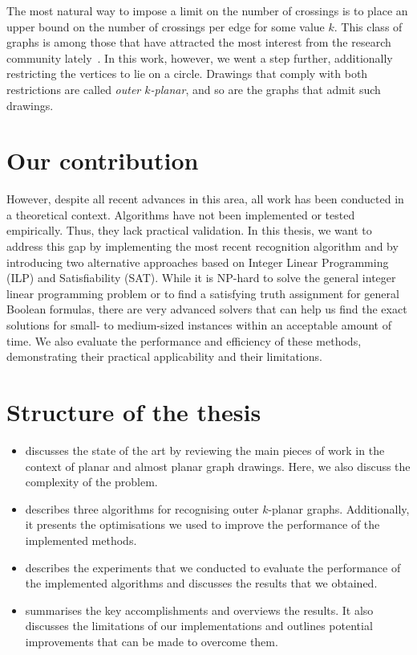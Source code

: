 The most natural way to impose a limit on the number of crossings is to place an upper bound on the number of crossings per edge for some value \(k\). This class of graphs is among those that have attracted the most interest from the research community lately~\cite{contest}. In this work, however, we went a step further, additionally restricting the vertices to lie on a circle. Drawings that comply with both restrictions are called \emph{outer \(k\)-planar}, and so are the graphs that admit such drawings.


\section{Our contribution}

However, despite all recent advances in this area, all work has been conducted in a theoretical context. Algorithms have not been implemented or tested empirically. Thus, they lack practical validation. In this thesis, we want to address this gap by implementing the most recent recognition algorithm and by introducing two alternative approaches based on Integer Linear Programming (ILP) and Satisfiability (SAT). While it is NP-hard to solve the general integer linear programming problem or to find a satisfying truth assignment for general Boolean formulas, there are very advanced solvers that can help us find the exact solutions for small- to medium-sized instances within an acceptable amount of time. We also evaluate the performance and efficiency of these methods, demonstrating their practical applicability and their limitations.


\section{Structure of the thesis}

\begin{itemize}
    \item {} discusses the state of the art by reviewing the main pieces of work in the context of planar and almost planar graph drawings. Here, we also discuss the complexity of the problem.
    \item {} describes three algorithms for recognising outer \(k\)-planar graphs. Additionally, it presents the optimisations we used to improve the performance of the implemented methods.
    \item {} describes the experiments that we conducted to evaluate the performance of the implemented algorithms and discusses the results that we obtained.
    \item {} summarises the key accomplishments and overviews the results. It also discusses the limitations of our implementations and outlines potential improvements that can be made to overcome them.
\end{itemize}
